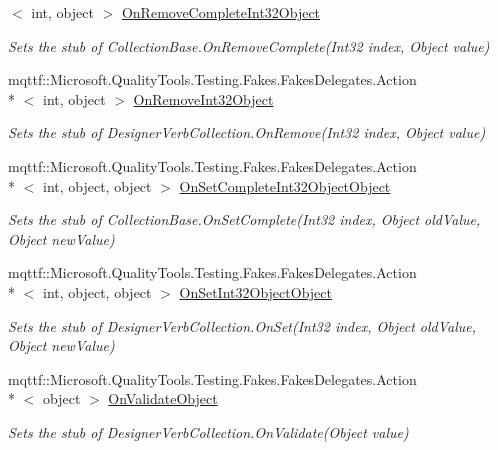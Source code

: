 \begin{DoxyCompactItemize}
$<$ int, object $>$ \hyperlink{class_system_1_1_component_model_1_1_design_1_1_fakes_1_1_stub_designer_verb_collection_a0e08ed78ae7fcc37deea23cc8e082843}{On\-Remove\-Complete\-Int32\-Object}
\begin{DoxyCompactList}\small\item\em Sets the stub of Collection\-Base.\-On\-Remove\-Complete(\-Int32 index, Object value)\end{DoxyCompactList}\item 
mqttf\-::\-Microsoft.\-Quality\-Tools.\-Testing.\-Fakes.\-Fakes\-Delegates.\-Action\\*
$<$ int, object $>$ \hyperlink{class_system_1_1_component_model_1_1_design_1_1_fakes_1_1_stub_designer_verb_collection_a6b074db032fffd2fa62d5aab04decd3d}{On\-Remove\-Int32\-Object}
\begin{DoxyCompactList}\small\item\em Sets the stub of Designer\-Verb\-Collection.\-On\-Remove(\-Int32 index, Object value)\end{DoxyCompactList}\item 
mqttf\-::\-Microsoft.\-Quality\-Tools.\-Testing.\-Fakes.\-Fakes\-Delegates.\-Action\\*
$<$ int, object, object $>$ \hyperlink{class_system_1_1_component_model_1_1_design_1_1_fakes_1_1_stub_designer_verb_collection_aecd9eb7bb924e2e810fe9ff3a7f16761}{On\-Set\-Complete\-Int32\-Object\-Object}
\begin{DoxyCompactList}\small\item\em Sets the stub of Collection\-Base.\-On\-Set\-Complete(\-Int32 index, Object old\-Value, Object new\-Value)\end{DoxyCompactList}\item 
mqttf\-::\-Microsoft.\-Quality\-Tools.\-Testing.\-Fakes.\-Fakes\-Delegates.\-Action\\*
$<$ int, object, object $>$ \hyperlink{class_system_1_1_component_model_1_1_design_1_1_fakes_1_1_stub_designer_verb_collection_a26cbb78d9baf5a46e437ab24d4f6ccbf}{On\-Set\-Int32\-Object\-Object}
\begin{DoxyCompactList}\small\item\em Sets the stub of Designer\-Verb\-Collection.\-On\-Set(\-Int32 index, Object old\-Value, Object new\-Value)\end{DoxyCompactList}\item 
mqttf\-::\-Microsoft.\-Quality\-Tools.\-Testing.\-Fakes.\-Fakes\-Delegates.\-Action\\*
$<$ object $>$ \hyperlink{class_system_1_1_component_model_1_1_design_1_1_fakes_1_1_stub_designer_verb_collection_a52b54d0f460301ba4da167b658cba09b}{On\-Validate\-Object}
\begin{DoxyCompactList}\small\item\em Sets the stub of Designer\-Verb\-Collection.\-On\-Validate(\-Object value)\end{DoxyCompactList}\end{DoxyCompactItemize}
